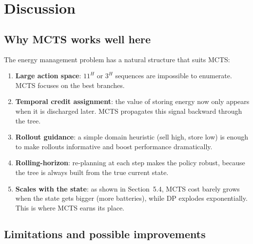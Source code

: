\documentclass[12pt,a4paper]{article}
\begin{document}
\section{Discussion}

\subsection{Why MCTS works well here}

The energy management problem has a natural structure that suits MCTS:
\begin{enumerate}
  \item \textbf{Large action space}: $11^{H}$ or $3^{H}$ sequences are
    impossible to enumerate. MCTS focuses on the best branches.
  \item \textbf{Temporal credit assignment}: the value of storing energy now
    only appears when it is discharged later. MCTS propagates this signal
    backward through the tree.
  \item \textbf{Rollout guidance}: a simple domain heuristic (sell high, store
    low) is enough to make rollouts informative and boost performance
    dramatically.
  \item \textbf{Rolling-horizon}: re-planning at each step makes the policy
    robust, because the tree is always built from the true current state.
  \item \textbf{Scales with the state}: as shown in Section~5.4, MCTS cost
    barely grows when the state gets bigger (more batteries), while DP explodes
    exponentially. This is where MCTS earns its place.
\end{enumerate}

\subsection{Limitations and possible improvements}
\end{document}
